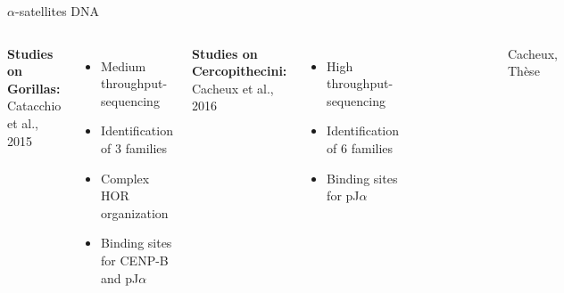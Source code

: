 \documentclass[11pt]{beamer}
\begin{document}
\begin{frame}{$\alpha$-satellites DNA}
	\begin{columns}
		\textbf{Studies on Gorillas:}\\
		{\tiny Catacchio et al., 2015}\\
		\begin{itemize}
			\item Medium throughput-sequencing
			\item Identification of 3 families 
			\item Complex HOR organization
			\item Binding sites for CENP-B and pJ$\alpha$
		\end{itemize}
		\textbf {Studies on Cercopithecini:}\\ 
		{\tiny Cacheux et al., 2016}\\
		\begin{itemize} 
			\item High throughput-sequencing
			\item Identification of 6 families
			\item Binding sites for pJ$\alpha$
		\end{itemize}	
		\begin{figure}
			\includegraphics[width=\textwidth]{img/phylogenie_primates.png}
		\end{figure}	
		\begin{flushright}
			{\tiny Cacheux, Thèse} 
		\end{flushright}		
	\end{columns}
\end{frame}
\end{document}
